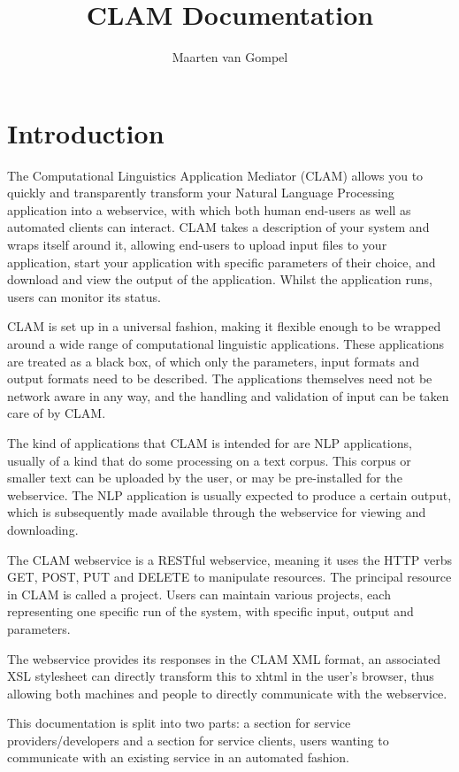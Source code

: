 \documentclass[a4paper,12pt]{report}
\title{CLAM Documentation}
\author{Maarten van Gompel}
\begin{document}
\maketitle

\chapter{Introduction} 

The Computational Linguistics Application Mediator (CLAM) allows you to quickly and transparently transform your Natural Language Processing application into a webservice, with which both human end-users as well as automated clients can interact. CLAM takes a description of your system and wraps itself around it, allowing end-users to upload input files to your application, start your application with specific parameters of their choice, and download and view the output of the application. Whilst the application runs, users can monitor its status.

CLAM is set up in a universal fashion, making it flexible enough to be wrapped around a wide range of computational linguistic applications. These applications are treated as a black box, of which only the parameters, input formats and output formats need to be described. The applications themselves need not be network aware in any way, and the handling and validation of input can be taken care of by CLAM.

The kind of applications that CLAM is intended for are NLP applications, usually of a kind that do some processing on a text corpus. This corpus or smaller text can be uploaded by the user, or may be pre-installed for the webservice. The NLP application is usually expected to produce a certain output, which is subsequently made available through the webservice for viewing and downloading.

The CLAM webservice is a RESTful webservice, meaning it uses the HTTP verbs GET, POST, PUT and DELETE to manipulate resources. The principal resource in CLAM is called a project. Users can maintain various projects, each representing one specific run of the system, with specific input, output and parameters.

The webservice provides its responses in the CLAM XML format, an associated XSL stylesheet can directly transform this to xhtml in the user's browser, thus allowing both machines and people to directly communicate with the webservice.

This documentation is split into two parts: a section for service providers/developers and a section for service clients, users wanting to communicate with an existing service in an automated fashion.
\end{document}
